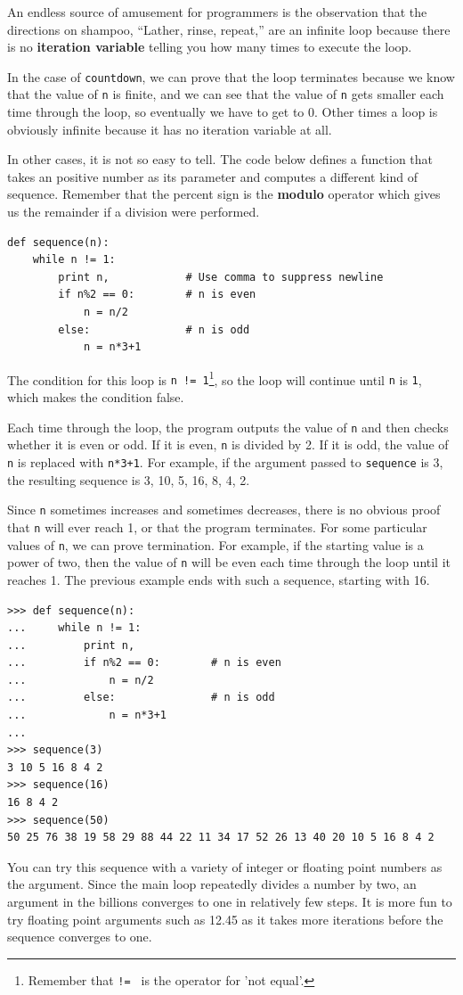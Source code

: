 \documentclass[10pt]{book}
\begin{document}
An endless source of amusement for 
programmers is the observation that the directions on shampoo,
``Lather, rinse, repeat,'' are an infinite loop because 
there is no {\bf iteration variable} telling you how many times
to execute the loop.


In the case of {\tt countdown}, we can prove that the loop
terminates because we know that the value of {\tt n} is finite, and we
can see that the value of {\tt n} gets smaller each time through the
loop, so eventually we have to get to 0.  Other times a loop is obviously
infinite because it has no iteration variable at all.

In other cases, it is not so easy to tell.  The code below defines a function
that takes an positive number as its parameter and computes a different 
kind of sequence.
Remember that the percent sign is the {\bf modulo} operator which gives us the
remainder if a division were performed.

\beforeverb
\begin{verbatim}
def sequence(n):
    while n != 1:
        print n,            # Use comma to suppress newline
        if n%2 == 0:        # n is even
            n = n/2
        else:               # n is odd
            n = n*3+1
\end{verbatim}
\afterverb
%
The condition for this loop is {\tt n != 1}\footnote{Remember that {\tt != } is the operator for 'not equal'.}, 
so the loop will continue
until {\tt n} is {\tt 1}, which makes the condition false.

Each time through the loop, the program outputs the value of {\tt n}
and then checks whether it is even or odd.  If it is even, {\tt n} is 
divided by 2.  If it is odd, the value of {\tt n} is replaced with
{\tt n*3+1}. For example, if the argument passed
to {\tt sequence} is 3, the resulting sequence is 3, 10, 5, 16, 8, 4, 2.

Since {\tt n} sometimes increases and sometimes decreases, there is no
obvious proof that {\tt n} will ever reach 1, or that the program
terminates.  For some particular values of {\tt n}, we can prove
termination.  For example, if the starting value is a power of two,
then the value of {\tt n} will be even each time through the loop
until it reaches 1. The previous example ends with such a sequence,
starting with 16.

\beforeverb
\begin{verbatim}
>>> def sequence(n):
...     while n != 1:
...         print n,
...         if n%2 == 0:        # n is even
...             n = n/2
...         else:               # n is odd
...             n = n*3+1
... 
>>> sequence(3)
3 10 5 16 8 4 2
>>> sequence(16)
16 8 4 2
>>> sequence(50)
50 25 76 38 19 58 29 88 44 22 11 34 17 52 26 13 40 20 10 5 16 8 4 2
\end{verbatim}
\afterverb
%
You can try this sequence with a variety of integer or floating 
point numbers as the argument.  
Since the main loop repeatedly divides a number
by two, an argument in the billions converges to one in 
relatively few steps.  
It is more fun to try floating point arguments 
such as 12.45 as it takes more iterations before the sequence
converges to one.
\end{document}
